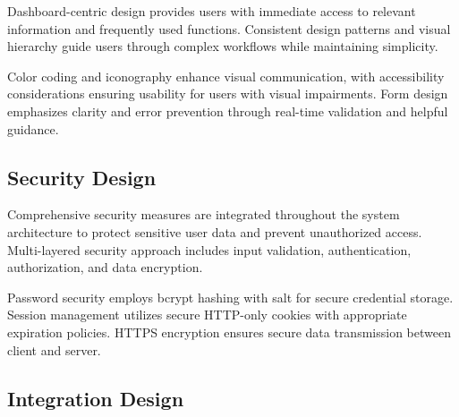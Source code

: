 \documentclass[12pt,a4paper]{report}
\begin{document}
Dashboard-centric design provides users with immediate access to relevant information and frequently used functions. Consistent design patterns and visual hierarchy guide users through complex workflows while maintaining simplicity.

Color coding and iconography enhance visual communication, with accessibility considerations ensuring usability for users with visual impairments. Form design emphasizes clarity and error prevention through real-time validation and helpful guidance.


\subsection{Security Design}

Comprehensive security measures are integrated throughout the system architecture to protect sensitive user data and prevent unauthorized access. Multi-layered security approach includes input validation, authentication, authorization, and data encryption.

Password security employs bcrypt hashing with salt for secure credential storage. Session management utilizes secure HTTP-only cookies with appropriate expiration policies. HTTPS encryption ensures secure data transmission between client and server.

\subsection{Integration Design}
\end{document}
